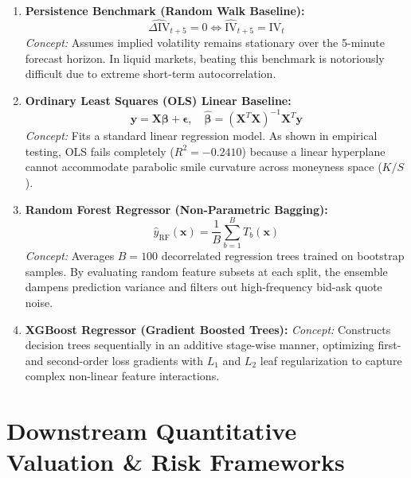 \begin{enumerate}
    \item \textbf{Persistence Benchmark (Random Walk Baseline):}
    \begin{equation}
        \widehat{\Delta \text{IV}}_{t+5} = 0 \iff \widehat{\text{IV}}_{t+5} = \text{IV}_t
    \end{equation}
    \textit{Concept:} Assumes implied volatility remains stationary over the 5-minute forecast horizon. In liquid markets, beating this benchmark is notoriously difficult due to extreme short-term autocorrelation.

    \item \textbf{Ordinary Least Squares (OLS) Linear Baseline:}
    \begin{equation}
        \mathbf{y} = \mathbf{X}\boldsymbol{\beta} + \boldsymbol{\epsilon}, \quad \widehat{\boldsymbol{\beta}} = (\mathbf{X}^T \mathbf{X})^{-1} \mathbf{X}^T \mathbf{y}
    \end{equation}
    \textit{Concept:} Fits a standard linear regression model. As shown in empirical testing, OLS fails completely ($R^2 = -0.2410$) because a linear hyperplane cannot accommodate parabolic smile curvature across moneyness space ($K/S$).

    \item \textbf{Random Forest Regressor (Non-Parametric Bagging):}
    \begin{equation}
        \widehat{y}_{\text{RF}}(\mathbf{x}) = \frac{1}{B} \sum_{b=1}^B T_b(\mathbf{x})
    \end{equation}
    \textit{Concept:} Averages $B = 100$ decorrelated regression trees trained on bootstrap samples. By evaluating random feature subsets at each split, the ensemble dampens prediction variance and filters out high-frequency bid-ask quote noise.

    \item \textbf{XGBoost Regressor (Gradient Boosted Trees):}
    \textit{Concept:} Constructs decision trees sequentially in an additive stage-wise manner, optimizing first- and second-order loss gradients with $L_1$ and $L_2$ leaf regularization to capture complex non-linear feature interactions.
\end{enumerate}

\section{Downstream Quantitative Valuation \& Risk Frameworks}
\label{sec:downstream_formulations}

